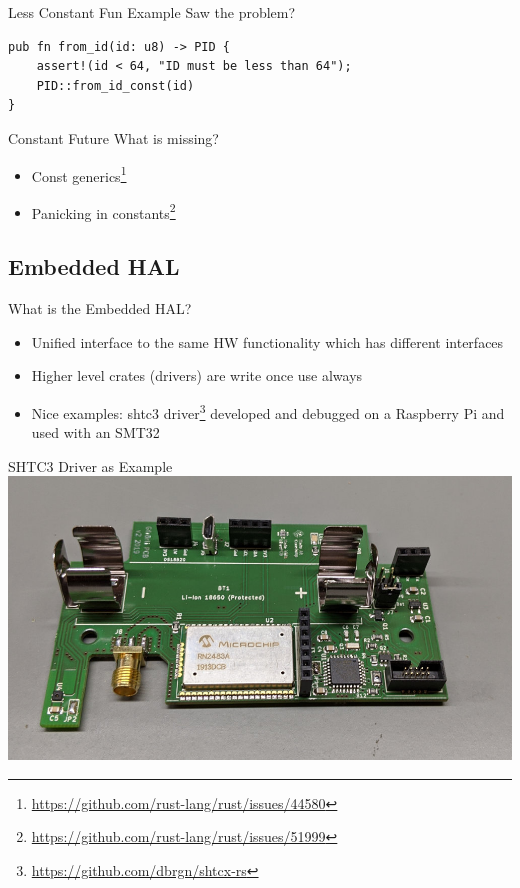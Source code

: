 \documentclass[aspectratio=1610,14pt,t]{beamer}
\begin{document}
\begin{frame}[c,fragile]{Less Constant Fun Example}
  Saw the problem?\pause
  \begin{verbatim}
pub fn from_id(id: u8) -> PID {
    assert!(id < 64, "ID must be less than 64");
    PID::from_id_const(id)
}
  \end{verbatim}
\end{frame}

\begin{frame}{Constant Future}
  What is missing?
  \begin{itemize}
    \item Const generics\footnote{\url{https://github.com/rust-lang/rust/issues/44580}}
    \item Panicking in constants\footnote{\url{https://github.com/rust-lang/rust/issues/51999}}
  \end{itemize}
\end{frame}

\subsection{Embedded HAL}

\begin{frame}[c]{What is the Embedded HAL?}
  \begin{itemize}
  \item Unified interface to the same HW functionality which has different
    interfaces
  \item Higher level crates (drivers) are write once use always
  \item Nice examples: shtc3
    driver\footnote{\url{https://github.com/dbrgn/shtcx-rs}} developed and
    debugged on a  Raspberry Pi and used with an SMT32
  \end{itemize}
\end{frame}

\begin{frame}[c]{SHTC3 Driver as Example}
  \includegraphics[height=0.8\textheight]{./img/gfroerli.jpg}
\end{frame}
\end{document}

